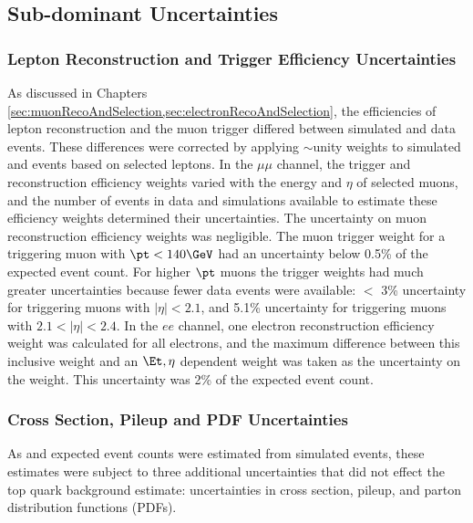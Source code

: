 \subsection{Sub-dominant Uncertainties}
\label{sec:subdominantUncs}

\subsubsection{Lepton Reconstruction and Trigger Efficiency Uncertainties}
\label{sec:leptonRecoTriggerEffUnc}
As discussed in Chapters \ref{sec:muonRecoAndSelection,sec:electronRecoAndSelection}, the efficiencies 
of lepton reconstruction and the muon trigger differed between simulated and data events.  These differences 
were corrected by applying $\sim$unity weights to simulated \DY and \WR events based on selected leptons.  
In the $\mu\mu$ channel, the trigger and reconstruction efficiency weights varied with the energy and $\eta$ of selected muons, and the 
number of events in data and simulations available to estimate these efficiency weights determined 
their uncertainties.  The uncertainty on muon reconstruction efficiency weights was negligible.  The muon trigger 
weight for a triggering muon with $\pt < 140\GeV$ had an uncertainty below 0.5\% of the expected event 
count.  For higher $\pt$ muons the trigger weights had much greater uncertainties because fewer data 
events were available: $<$ 3\% uncertainty for triggering muons with $|\eta| < 2.1$, and 5.1\% uncertainty 
for triggering muons with $2.1 < |\eta| < 2.4$.  In the $ee$ channel, one electron reconstruction 
efficiency weight was calculated for all electrons, and the maximum difference between this inclusive 
weight and an $\Et, \eta$ dependent weight was taken as the uncertainty on the weight.  This uncertainty 
was 2\% of the expected event count.

\subsubsection{Cross Section, Pileup and PDF Uncertainties}
\label{sec:crossSxnPileupPdfUnc}
As \DY and \WR expected event counts were estimated from simulated events, these estimates were subject 
to three additional uncertainties that did not effect the top quark background estimate: uncertainties 
in cross section, pileup, and parton distribution functions (PDFs).


